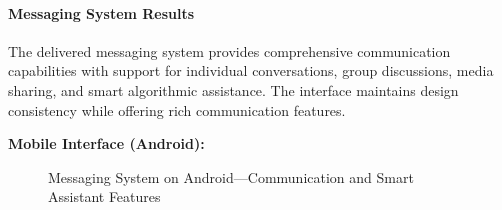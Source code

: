 \paragraph{Messaging System Results}
The delivered messaging system provides comprehensive communication capabilities with support for individual conversations, group discussions, media sharing, and smart algorithmic assistance. The interface maintains design consistency while offering rich communication features.
\clearpage

\textbf{Mobile Interface (Android):}
\begin{figure}[!htbp]
    \centering
    \hspace{0.05\textwidth}
    \caption{Messaging System on Android---Communication and Smart Assistant Features}\label{fig:android_messaging}
\end{figure}

